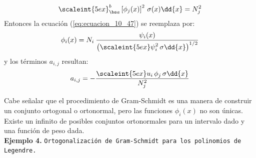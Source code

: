 \begin{align*}
\scaleint{5ex}_{\bs a}^{b} \left[ \phi_{j} (x) \right]^{2} \, \sigma (x) \dd{x} =  N_{j}^{2}
\end{align*}
Entonces la ecuación (\ref{eq:ecuacion_10_47}) se reemplaza por:
\begin{align}
\phi_{i}(x) =  N_{i} \: \dfrac{\psi_{i}(x)}{\left( \displaystyle \scaleint{5ex} \psi_{i}^{2} \, \sigma \dd{x} \right)^{1/2}}
\label{eq:ecuacion_10_47a}
\end{align}
y los términos $a_{i,j}$ resultan:
\begin{align}
a_{i, j} = - \dfrac{ \displaystyle \scaleint{5ex} u_{i} \, \phi_{j} \, \sigma \dd{x}}{N_{j}^{2}}
\label{eq:ecuacion_10_49a}
\end{align}

Cabe señalar que el procedimiento de Gram-Schmidt es una manera de construir un conjunto ortogonal o ortonormal, pero las funciones $\phi_{i}(x)$ no son únicas. Existe un infinito de posibles conjuntos ortonormales para un intervalo dado y una función de peso dada.
\\[0.5em]
\noindent
\textbf{Ejemplo 4. } \texttt{Ortogonalización de Gram-Schmidt para los polinomios de Legendre.}

